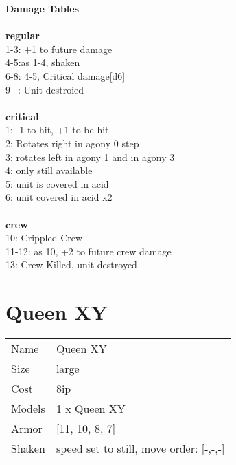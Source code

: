{\bf Damage Tables} \\
\ \\ {\bf regular } \\
1-3: +1 to future damage \\
4-5:as 1-4, shaken \\
6-8: 4-5, Critical damage[d6] \\
9+: Unit destroied \\
\ \\ {\bf critical } \\
1: -1 to-hit, +1 to-be-hit \\
2: Rotates right in agony 0 step \\
3: rotates left in agony 1 and in agony 3 \\
4: only still available \\
5: unit is covered in acid \\
6: unit covered in acid x2 \\
\ \\ {\bf crew } \\
10: Crippled Crew \\
11-12: as 10, +2 to future crew damage \\
13: Crew Killed, unit destroyed \\










\pagebreak\pagebreak

\section{ Queen XY }

\begin{tabular}{ll}
  Name & Queen XY \\
  Size & large\\
  Cost & 8ip\\
  Models & 1 x Queen XY\\
  Armor & [11, 10, 8, 7]\\
  Shaken & speed set to still, move order: [-,-,-]\\
\end{tabular}

\noindent 


